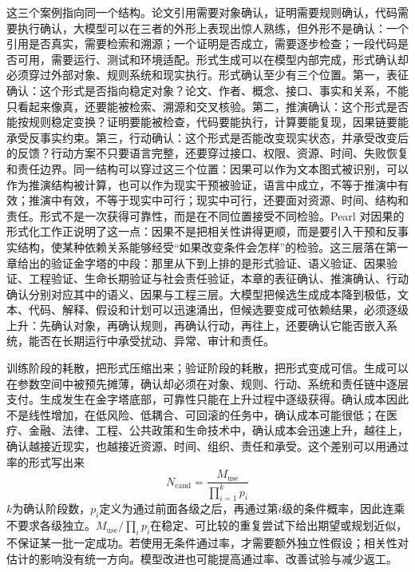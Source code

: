 这三个案例指向同一个结构。论文引用需要对象确认，证明需要规则确认，代码需要执行确认，大模型可以在三者的外形上表现出惊人熟练，但外形不是确认：一个引用是否真实，需要检索和溯源；一个证明是否成立，需要逐步检查；一段代码是否可用，需要运行、测试和环境适配。形式生成可以在模型内部完成，形式确认却必须穿过外部对象、规则系统和现实执行。形式确认至少有三个位置。第一，表征确认：这个形式是否指向稳定对象？论文、作者、概念、接口、事实和关系，不能只看起来像真，还要能被检索、溯源和交叉核验。第二，推演确认：这个形式是否能按规则稳定变换？证明要能被检查，代码要能执行，计算要能复现，因果链要能承受反事实约束。第三，行动确认：这个形式是否能改变现实状态，并承受改变后的反馈？行动方案不只要语言完整，还要穿过接口、权限、资源、时间、失败恢复和责任边界。同一结构可以穿过这三个位置：因果可以作为文本图式被识别，可以作为推演结构被计算，也可以作为现实干预被验证，语言中成立，不等于推演中有效；推演中有效，不等于现实中可行；现实中可行，还要面对资源、时间、结构和责任。形式不是一次获得可靠性，而是在不同位置接受不同检验。Pearl 对因果的形式化工作正说明了这一点：因果不是把相关性讲得更顺，而是要引入干预和反事实结构，使某种依赖关系能够经受“如果改变条件会怎样”的检验\cite{pearl2009causality}。这三层落在第一章给出的验证金字塔的中段：那里从下到上排的是形式验证、语义验证、因果验证、工程验证、生命长期验证与社会责任验证，本章的表征确认、推演确认、行动确认分别对应其中的语义、因果与工程三层。大模型把候选生成成本降到极低，文本、代码、解释、假设和计划可以迅速涌出，但候选要变成可依赖结果，必须逐级上升：先确认对象，再确认规则，再确认行动，再往上，还要确认它能否嵌入系统，能否在长期运行中承受扰动、异常、审计和责任。


训练阶段的耗散，把形式压缩出来；验证阶段的耗散，把形式变成可信。生成可以在参数空间中被预先摊薄，确认却必须在对象、规则、行动、系统和责任链中逐层支付。生成发生在金字塔底部，可靠性只能在上升过程中逐级获得。确认成本因此不是线性增加，在低风险、低耦合、可回滚的任务中，确认成本可能很低；在医疗、金融、法律、工程、公共政策和生命技术中，确认成本会迅速上升，越往上，确认越接近现实，也越接近资源、时间、组织、责任和承受。这个差别可以用通过率的形式写出来
\begin{equation}
N_{\text{cand}}=\frac{M_{\text{use}}}{\prod_{i=1}^{k}p_i}
\end{equation}
$k$为确认阶段数，$p_i$定义为通过前面各级之后，再通过第$i$级的条件概率，因此连乘不要求各级独立。$M_{\mathrm{use}}/\prod_i p_i$在稳定、可比较的重复尝试下给出期望或规划近似，不保证某一批一定成功。若使用无条件通过率，才需要额外独立性假设；相关性对估计的影响没有统一方向。模型改进也可能提高通过率、改善试验与减少返工。

